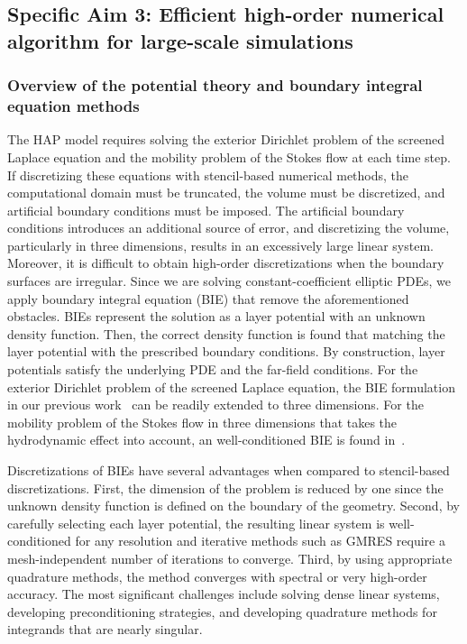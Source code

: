 \subsection{Specific Aim 3: Efficient high-order numerical algorithm for
large-scale simulations}
\label{subsec:specific_aim_3}
\subsubsection{Overview of the potential theory and boundary integral
equation methods} 
The HAP model requires solving the exterior Dirichlet problem of the
screened Laplace equation and the mobility problem of the Stokes flow at
each time step. If discretizing these equations with stencil-based
numerical methods, the computational domain must be truncated, the
volume must be discretized, and artificial boundary conditions must be
imposed. The artificial boundary conditions introduces an additional
source of error, and discretizing the volume, particularly in three
dimensions, results in an excessively large linear system. Moreover, it
is difficult to obtain high-order discretizations when the boundary
surfaces are irregular. Since we are solving constant-coefficient
elliptic PDEs, we apply boundary integral equation (BIE) that remove the
aforementioned obstacles. BIEs represent the solution as a layer
potential with an unknown density function. Then, the correct density
function is found that matching the layer potential with the prescribed
boundary conditions. By construction, layer potentials satisfy the
underlying PDE and the far-field conditions. For the exterior Dirichlet
problem of the screened Laplace equation, the BIE formulation in our
previous work~\cite{Fu2018_SIAM} can be readily extended to three
dimensions. For the mobility problem of the Stokes flow in three
dimensions that takes the hydrodynamic effect into account, an
well-conditioned BIE is found in~\cite{manasthesis}.

Discretizations of BIEs have several advantages when compared to
stencil-based discretizations. First, the dimension of the problem is
reduced by one since the unknown density function is defined on the
boundary of the geometry. Second, by carefully selecting each layer
potential, the resulting linear system is well-conditioned for any
resolution and iterative methods such as GMRES require a
mesh-independent number of iterations to converge. Third, by using
appropriate quadrature methods, the method converges with spectral or
very high-order accuracy. The most significant challenges include
solving dense linear systems, developing preconditioning strategies, and
developing quadrature methods for integrands that are nearly singular. 

